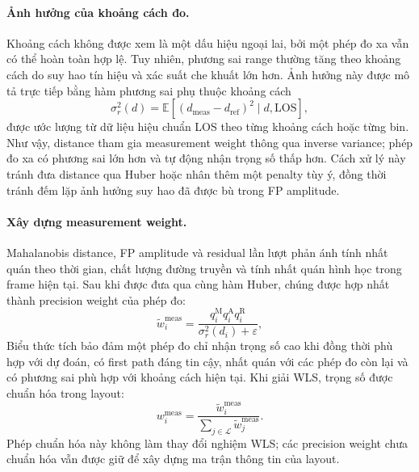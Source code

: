 \documentclass[
  a4paper,
]{report}
\begin{document}
\paragraph{Ảnh hưởng của khoảng cách đo.}

Khoảng cách không được xem là một dấu hiệu ngoại lai, bởi một phép đo xa vẫn
có thể hoàn toàn hợp lệ. Tuy nhiên, phương sai range thường tăng theo khoảng
cách do suy hao tín hiệu và xác suất che khuất lớn hơn. Ảnh hưởng này được mô
tả trực tiếp bằng hàm phương sai phụ thuộc khoảng cách
\begin{equation}
  \sigma_r^2(d)=
  \mathbb{E}\!\left[(d_{\mathrm{meas}}-d_{\mathrm{ref}})^2
  \mid d,\mathrm{LOS}\right],
  \label{eq:distance-dependent-range-variance}
\end{equation}
được ước lượng từ dữ liệu hiệu chuẩn LOS theo từng khoảng cách hoặc từng bin.
Như vậy, distance tham gia measurement weight thông qua inverse variance;
phép đo xa có phương sai lớn hơn và tự động nhận trọng số thấp hơn. Cách xử lý
này tránh đưa distance qua Huber hoặc nhân thêm một penalty tùy ý, đồng thời
tránh đếm lặp ảnh hưởng suy hao đã được bù trong FP amplitude.

\paragraph{Xây dựng measurement weight.}

Mahalanobis distance, FP amplitude và residual lần lượt phản ánh tính nhất
quán theo thời gian, chất lượng đường truyền và tính nhất quán hình học trong
frame hiện tại. Sau khi được đưa qua cùng hàm Huber, chúng được hợp nhất thành
precision weight của phép đo:
\begin{equation}
  \widetilde w_i^{\mathrm{meas}}=
  \frac{q_i^{\mathrm{M}}q_i^{\mathrm{A}}q_i^{\mathrm{R}}}
       {\sigma_r^{2}(d_i)+\varepsilon},
  \label{eq:measurement-precision-weight}
\end{equation}
Biểu thức tích bảo đảm một phép đo chỉ nhận trọng số cao khi đồng thời phù hợp
với dự đoán, có first path đáng tin cậy, nhất quán với các phép đo còn lại và
có phương sai phù hợp với khoảng cách hiện tại. Khi giải WLS,
trọng số được chuẩn hóa trong layout:
\begin{equation}
  w_i^{\mathrm{meas}}=
  \frac{\widetilde w_i^{\mathrm{meas}}}
       {\sum_{j\in\mathcal L}\widetilde w_j^{\mathrm{meas}}}.
  \label{eq:normalized-measurement-weight}
\end{equation}
Phép chuẩn hóa này không làm thay đổi nghiệm WLS; các precision weight chưa
chuẩn hóa vẫn được giữ để xây dựng ma trận thông tin của layout.
\end{document}
